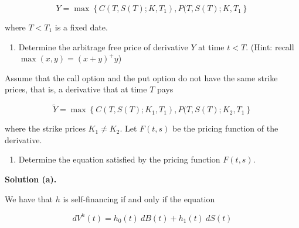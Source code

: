 \documentclass[a4paper,12pt,openany]{book}
\providecommand{\tightlist}{%
 \setlength{\itemsep}{0pt}\setlength{\parskip}{0pt}}
\begin{document}
\[
Y=\max\left\{C(T,S(T);K,T_1),P(T,S(T);K,T_1\right\}
\]

where \(T<T_1\) is a fixed date.

\begin{enumerate}
\def\labelenumi{\alph{enumi}.}
\setcounter{enumi}{2}
\tightlist
\item
  Determine the arbitrage free price of derivative \(Y\) at time \(t<T\). (Hint: recall \(\max(x,y)=(x+y)^+y\))
\end{enumerate}

Assume that the call option and the put option do not have the same strike prices, that is, a derivative that at time \(T\) pays

\[
\widetilde{Y}=\max\left\{C(T,S(T);K_1,T_1),P(T,S(T);K_2,T_1\right\}
\]

where the strike prices \(K_1\ne K_2\). Let \(F(t,s)\) be the pricing function of the derivative.

\begin{enumerate}
\def\labelenumi{\alph{enumi}.}
\setcounter{enumi}{3}
\tightlist
\item
  Determine the equation satisfied by the pricing function \(F(t,s)\).
\end{enumerate}

\noindent\makebox[\linewidth]{\rule{\textwidth}{0.4pt}}

\textbf{Solution (a).}

We have that \(h\) is self-financing if and only if the equation

\[
dV^h(t)=h_0(t)\ dB(t)+h_1(t)\ dS(t)
\]
\end{document}
